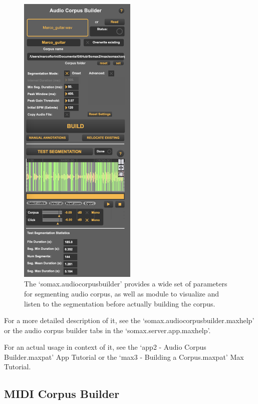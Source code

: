  \begin{figure}[H]
    \centering        
 	\includegraphics[width=0.5\textwidth, keepaspectratio]{img/audiocorpusbuilder.png}
    \caption{The `somax.audiocorpusbuilder' provides a wide set of parameters for segmenting audio corpus, as well as module to visualize and listen to the segmentation before actually building the corpus.}
    \label{fig:audiocorpusbuilder}
\end{figure}

For a more detailed description of it, see the `somax.audiocorpusbuilder.maxhelp' or the audio corpus builder tabs in the `somax.server.app.maxhelp'.

For an actual usage in context of it, see the `app2 - Audio Corpus Builder.maxpat' App Tutorial or the `max3 - Building a Corpus.maxpat' Max Tutorial.

\subsection{MIDI Corpus Builder}

